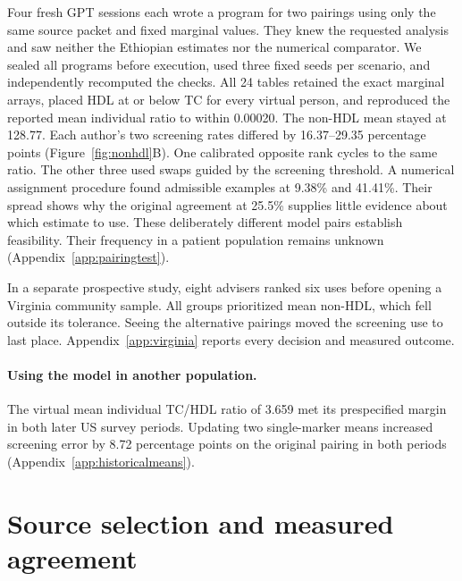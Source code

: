 Four fresh GPT sessions each wrote a program for two pairings using only the same source packet and fixed marginal values. They knew the requested analysis and saw neither the Ethiopian estimates nor the numerical comparator. We sealed all programs before execution, used three fixed seeds per scenario, and independently recomputed the checks. All 24 tables retained the exact marginal arrays, placed HDL at or below TC for every virtual person, and reproduced the reported mean individual ratio to within 0.00020. The non-HDL mean stayed at 128.77. Each author's two screening rates differed by 16.37--29.35 percentage points (Figure~\ref{fig:nonhdl}B). One calibrated opposite rank cycles to the same ratio. The other three used swaps guided by the screening threshold. A numerical assignment procedure found admissible examples at 9.38\% and 41.41\%. Their spread shows why the original agreement at 25.5\% supplies little evidence about which estimate to use. These deliberately different model pairs establish feasibility. Their frequency in a patient population remains unknown (Appendix~\ref{app:pairingtest}).

In a separate prospective study, eight advisers ranked six uses before opening a Virginia community sample. All groups prioritized mean non-HDL, which fell outside its tolerance. Seeing the alternative pairings moved the screening use to last place. Appendix~\ref{app:virginia} reports every decision and measured outcome.

\paragraph{Using the model in another population.}
The virtual mean individual TC/HDL ratio of 3.659 met its prespecified margin in both later US survey periods. Updating two single-marker means increased screening error by 8.72 percentage points on the original pairing in both periods (Appendix~\ref{app:historicalmeans}).

\section{Source selection and measured agreement}
\label{app:ocular}

